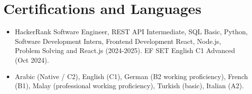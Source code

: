 \documentclass[11pt,a4paper,sans]{moderncv}
\begin{document}
\section{Certifications and Languages}
\vspace{1pt}
\begin{itemize}
\item {HackerRank Software Engineer, REST API Intermediate, SQL Basic, Python, Software Development Intern, Frontend Development React, Node.js, Problem Solving and React.js (2024-2025). EF SET English C1 Advanced (Oct 2024).}
\item {Arabic (Native / C2), English (C1), German (B2 working proficiency), French (B1), Malay (professional working proficiency), Turkish (basic), Italian (A2).}
\end{itemize}
\end{document}
